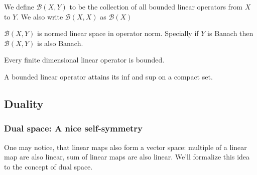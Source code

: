 \begin{definition}[$\mathscr B$]\rm\nextline
	We define $\mathscr B(X,Y)$ to be the collection of all bounded linear operators from $X$ to $Y$. We also write $\mathscr B(X,X)$ as $\mathscr B(X)$
\end{definition}

\begin{proposition}\rm\nextline
	$\mathscr B(X,Y)$ is normed linear space in operator norm. Specially if $Y$ is Banach then $\mathscr B(X,Y)$ is also Banach.
\end{proposition}

\begin{theorem}\rm\nextline
	Every finite dimensional linear operator is bounded.
\end{theorem}

\begin{theorem}\rm\nextline
	A bounded linear operator attains its inf and sup on  a compact set.
\end{theorem}

\subsection{Duality}

\subsubsection{Dual space: A nice self-symmetry}
One may notice, that linear maps also form a vector space: multiple of a linear map are also linear, sum of linear maps are also linear. We'll formalize this idea to the concept of dual space.

